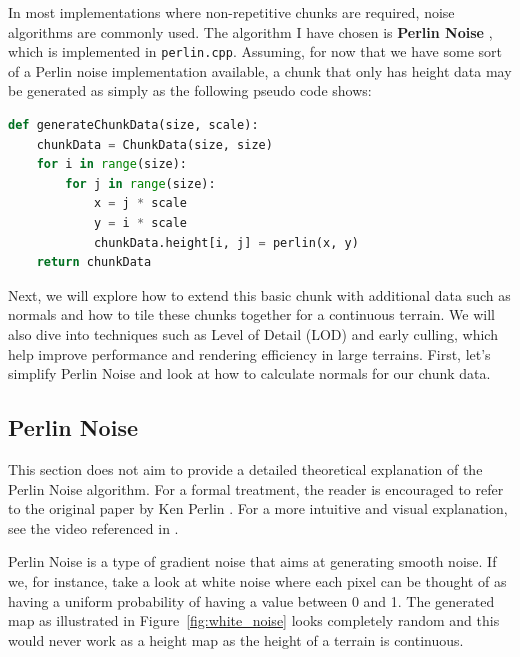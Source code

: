 In most implementations where non-repetitive chunks are required, noise algorithms are commonly used. The algorithm I have chosen is \textbf{Perlin Noise} \cite{perlin2002improving}, which is implemented in \texttt{perlin.cpp}. Assuming, for now that we have some sort of a Perlin noise implementation available, a chunk that only has height data may be generated as simply as the following pseudo code shows:

\begin{lstlisting}[language=Python]
def generateChunkData(size, scale):
	chunkData = ChunkData(size, size)
	for i in range(size):
		for j in range(size):
			x = j * scale
			y = i * scale
			chunkData.height[i, j] = perlin(x, y)
	return chunkData
\end{lstlisting}

Next, we will explore how to extend this basic chunk with additional data such as normals and how to tile these chunks together for a continuous terrain. We will also dive into techniques such as Level of Detail (LOD) and early culling, which help improve performance and rendering efficiency in large terrains. First, let’s simplify Perlin Noise and look at how to calculate normals for our chunk data.


\subsection{Perlin Noise}

This section does not aim to provide a detailed theoretical explanation of the Perlin Noise algorithm. For a formal treatment, the reader is encouraged to refer to the original paper by Ken Perlin \cite{perlin2002improving}. For a more intuitive and visual explanation, see the video referenced in \cite{perlin_video}. 

Perlin Noise is a type of gradient noise that aims at generating smooth noise. If we, for instance, take a look at white noise where each pixel can be thought of as having a uniform probability of having a value between 0 and 1. The generated map as illustrated in Figure~\ref{fig:white_noise} looks completely random and this would never work as a height map as the height of a terrain is continuous.

